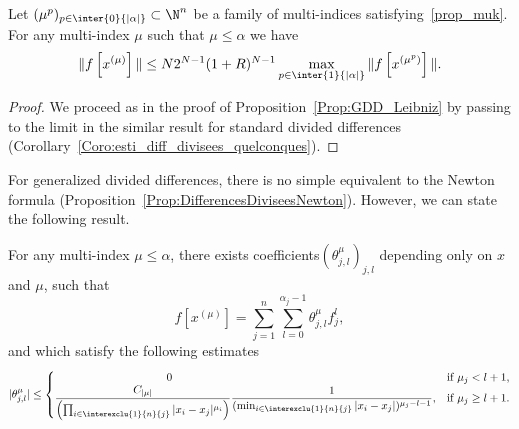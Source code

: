 \begin{prop}\label{Prop:Diagonale_GDD}
Let $(\mu^p)_{p\in \inter{0}{|\alpha|}} \subset \N^n $ be a family of multi-indices satisfying~\eqref{prop_muk}. For any multi-index $\mu$ such that $\mu\leq \alpha$ we have
\[
\| f\left[x^{(\mu)}\right] \| \leq N 2^{N-1} (1+R)^{N-1} \max_{p\in \inter{1}{|\alpha|}} \|f\left[x^{(\mu^p)}\right]\|.
\]
\end{prop}

\begin{proof}
We proceed as in the proof of Proposition~\ref{Prop:GDD_Leibniz} by passing to the limit in the similar result for standard divided differences (Corollary~\ref{Coro:esti_diff_divisees_quelconques}).
\end{proof}

For generalized divided differences, there is no simple equivalent to the Newton formula (Proposition~\ref{Prop:DifferencesDiviseesNewton}). However, we can state the following result.

\begin{prop}\label{Prop:NewtonGDD}
For any multi-index $\mu\leq \alpha$, there exists coefficients\linebreak$(\theta^\mu_{j,l})_{j,l}$ depending only on $x$ and $\mu$, such that
\[
f[x^{(\mu)}] = \sum_{j=1}^n \sum_{l=0}^{\alpha_j-1} \theta^\mu_{j,l} f_j^l,
\]
and which satisfy the following estimates
\[
|\theta^\mu_{j,l}| \leq
\begin{cases}
\mkern180mu 0 & \text{if }\mu_j<l+1,\\
\displaystyle \frac{C_{|\mu|}}{\left(\prod_{i\in\interexclu{1}{n}{j}} |x_i-x_j|^{\mu_i}\right)} \frac{1}{(\min_{i\in\interexclu{1}{n}{j}} |x_i-x_j|)^{\mu_j-l-1}}, & \text{if }\mu_j\geq l+1.
\end{cases}
\]
\end{prop}

